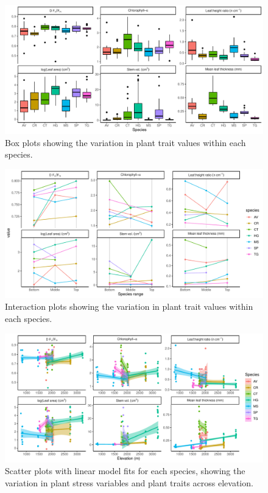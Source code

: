 \documentclass[a4paper, 11pt]{article}
\begin{document}
\begin{figure}[H]
\includegraphics[width=\textwidth]{box}
\centering
\caption{Box plots showing the variation in plant trait values within each species.}
\label{box}
\end{figure}

\begin{figure}[H]
\includegraphics[width=\textwidth]{spaghetti}
\centering
\caption{Interaction plots showing the variation in plant trait values within each species.}
\label{spaghetti}
\end{figure}

\begin{figure}[H]
\includegraphics[width=\textwidth]{traits_elev_scatter}
\centering
\caption{Scatter plots with linear model fits for each species, showing the variation in plant stress variables and plant traits across elevation.}
\label{traits_elev_scatter}
\end{figure}
\end{document}
